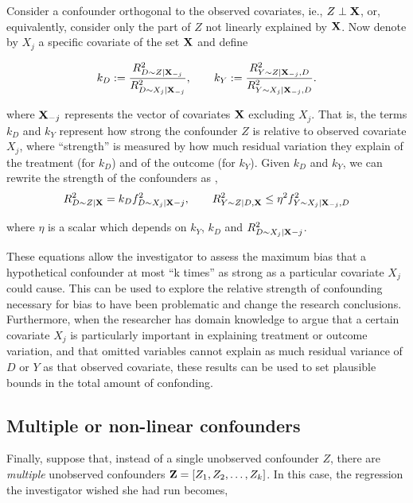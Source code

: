 \documentclass[
]{jss}
\begin{document}
Consider a confounder orthogonal to the observed covariates, ie.,
\(Z \perp {\bf X}\), or, equivalently, consider only the part of \(Z\)
not linearly explained by \({\bf X}\). Now denote by \(X_j\) a specific
covariate of the set \({\bf X}\) and define

\noindent  \begin{align}
k_D := \frac{R^2_{D\sim Z|{\bf X}_{-j}}}{R^2_{D\sim X_{j}|{\bf X}_{-j}} },  \qquad k_Y := \frac{R^2_{Y \sim Z |{\bf X}_{-j},D}}{R^2_{Y \sim X_{j} |{\bf X}_{-j},D}}.
\end{align}

where \({\bf X}_{-j}\) represents the vector of covariates \({\bf X}\)
excluding \(X_{j}\). That is, the terms \(k_D\) and \(k_Y\) represent
how strong the confounder \(Z\) is relative to observed covariate
\(X_j\), where ``strength'' is measured by how much residual variation
they explain of the treatment (for \(k_D\)) and of the outcome (for
\(k_Y\)). Given \(k_D\) and \(k_Y\), we can rewrite the strength of the
confounders as \citep{cinelli:jrssb2019}, \begin{align}
R^2_{D\sim Z|{\bf X}} = k_D f^2_{D\sim X_{j}|{\bf X}{-j}}, \qquad R^2_{Y\sim Z|D, {\bf X}} \leq \eta^2 f^2_{Y \sim X_j|{\bf X}_{-j},D} \label{eq:bounds}
\end{align}

\noindent where \(\eta\) is a scalar which depends on \(k_Y\), \(k_D\)
and \(R^2_{D\sim X_{j}|{\bf X}{-j}}\).

These equations allow the investigator to assess the maximum bias that a
hypothetical confounder at most ``k times'' as strong as a particular
covariate \(X_j\) could cause. This can be used to explore the relative
strength of confounding necessary for bias to have been problematic and
change the research conclusions. Furthermore, when the researcher has
domain knowledge to argue that a certain covariate \(X_j\) is
particularly important in explaining treatment or outcome variation, and
that omitted variables cannot explain as much residual variance of \(D\)
or \(Y\) as that observed covariate, these results can be used to set
plausible bounds in the total amount of confonding.

\hypertarget{multiple}{%
\subsection{Multiple or non-linear confounders}\label{multiple}}

Finally, suppose that, instead of a single unobserved confounder \(Z\),
there are \emph{multiple} unobserved confounders
\({\bf Z} = [Z_1, Z_2, \dots, Z_k]\). In this case, the regression the
investigator wished she had run becomes,
\end{document}
